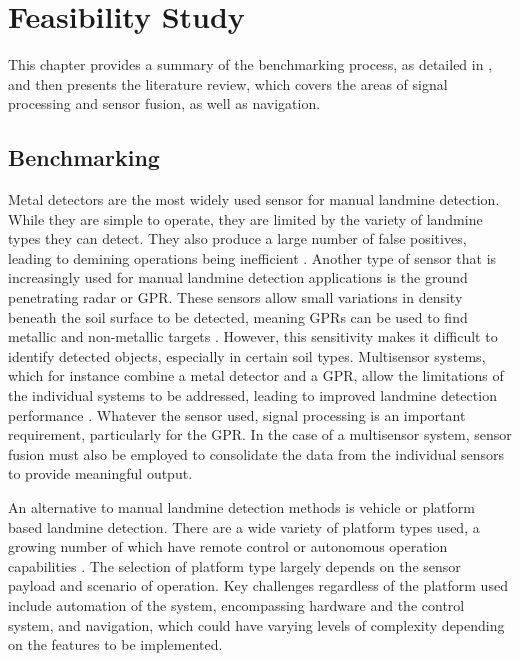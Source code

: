 \documentclass[main.tex]{subfiles}
\begin{document}
\chapter{Feasibility Study}
This chapter provides a summary of the benchmarking process, as detailed in , and then presents the literature review, which covers the areas of signal processing and sensor fusion, as well as navigation. 

\section{Benchmarking}
Metal detectors are the most widely used sensor for manual landmine detection. While they are simple to operate, they are limited by the variety of landmine types they can detect. They also produce a large number of false positives, leading to demining operations being inefficient \parencite{minelabF3}. Another type of sensor that is increasingly used for manual landmine detection applications is the ground penetrating radar or GPR. These sensors allow small variations in density beneath the soil surface to be detected, meaning GPRs can be used to find metallic and non-metallic targets \parencite{sakaguchi2014}. However, this sensitivity makes it difficult to identify detected objects, especially in certain soil types. Multisensor systems, which for instance combine a metal detector and a GPR, allow the limitations of the individual systems to be addressed, leading to improved landmine detection performance \parencite{Takahashi10}. Whatever the sensor used, signal processing is an important requirement, particularly for the GPR. In the case of a multisensor system, sensor fusion must also be employed to consolidate the data from the individual sensors to provide meaningful output.  

An alternative to manual landmine detection methods is vehicle or platform based landmine detection. There are a wide variety of platform types used, a growing number of which have remote control or autonomous operation capabilities \parencite{portugal2014}. The selection of platform type largely depends on the sensor payload and scenario of operation. Key challenges regardless of the platform used include automation of the system, encompassing hardware and the control system, and navigation, which could have varying levels of complexity depending on the features to be implemented. 
\end{document}
